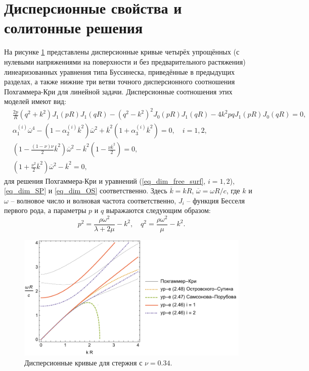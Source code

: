 \documentclass[12pt, a4paper]{report}
\begin{document}
\section{Дисперсионные свойства и солитонные решения}

На рисунке \ref{fig:disp} представлены дисперсионные кривые четырёх упрощённых (с нулевыми напряжениями на поверхности и без предварительного растяжения) линеаризованных уравнения типа Буссинеска, приведённые в предыдущих разделах, а также нижние три ветви точного дисперсионного соотношения Похгаммера-Кри для линейной задачи.
Дисперсионные соотношения этих моделей имеют вид:
\begin{align}
&\frac{2p}{R}\left(q^2 + k^2\right) J_1(pR) J_1(qR) - \left(q^2 - k^2\right)^2 J_0(pR) J_1(qR) -4k^2 p q J_1(pR) J_0(qR) = 0,\\
& \alpha_1^{(i)} \overline{\omega}^4 - \left(1 - \alpha_2^{(i)} \overline{k}^2\right) \overline{\omega}^2 + \overline{k}^2 \left(1 + \alpha_3^{(i)} \overline{k}^2 \right) = 0, \quad i = 1,2,\\
& \left(1 - \frac{(1-\nu)\nu}{2} \overline{k}^2\right) \overline{\omega}^2 - \overline{k}^2 \left(1 - \frac{\nu  \overline{k}^2}{2}\right) = 0,\\
& \left(1 + \frac{\nu^2}{2} \overline{k}^2\right) \overline{\omega}^2 - \overline{k}^2 = 0,
\end{align}
для решения Похгаммера-Кри и уравнений (\ref{eq_dim_free_surf}, $i=1,2$), \eqref{eq_dim_SP} и \eqref{eq_dim_OS} соответственно. Здесь $\overline{k} = k R$, $\overline{\omega} = \omega R / c$, где $k$ и $\omega$ -- волновое число и волновая частота соответственно, $J_i$ -- функция Бесселя первого рода, а параметры $p$ и $q$ выражаются следующим образом:
\begin{equation}
p^2 = \frac{\rho \omega^2}{\lambda + 2\mu} - k^2, \quad q^2 = \frac{\rho \omega^2}{\mu} - k^2.
\end{equation}

\begin{figure}[h]
	\centering
	\includegraphics[width=0.85\linewidth]{Fig2}
	\caption{Дисперсионные кривые для стержня с $\nu = 0.34$. %
	}
	\label{fig:disp}
\end{figure} 
\end{document}
